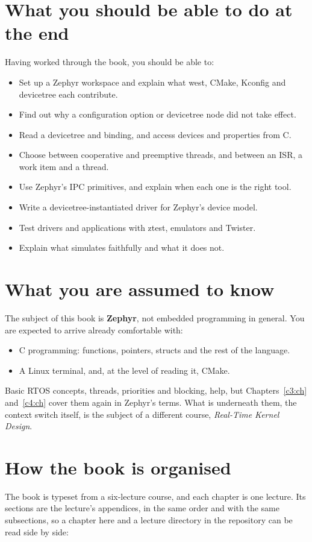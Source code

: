 \section*{What you should be able to do at the end}
Having worked through the book, you should be able to:
\begin{itemize}
  \item Set up a Zephyr workspace and explain what west, CMake, Kconfig and devicetree each
    contribute.
  \item Find out why a configuration option or devicetree node did not take effect.
  \item Read a devicetree and binding, and access devices and properties from C.
  \item Choose between cooperative and preemptive threads, and between an ISR, a work item and a
    thread.
  \item Use Zephyr's IPC primitives, and explain when each one is the right tool.
  \item Write a devicetree-instantiated driver for Zephyr's device model.
  \item Test drivers and applications with ztest, emulators and Twister.
  \item Explain what  simulates faithfully and what it does not.
\end{itemize}

\section*{What you are assumed to know}
The subject of this book is \textbf{Zephyr}, not embedded programming in general. You are expected
to arrive already comfortable with:
\begin{itemize}
  \item C programming: functions, pointers, structs and the rest of the language.
  \item A Linux terminal,  and, at the level of reading it, CMake.
\end{itemize}
Basic RTOS concepts, threads, priorities and blocking, help, but Chapters~\ref{c3:ch}
and~\ref{c4:ch} cover them again in Zephyr's terms. What is underneath them, the context switch
itself, is the subject of a different course, \emph{Real-Time Kernel Design}.

\section*{How the book is organised}
The book is typeset from a six-lecture course, and each chapter is one lecture. Its sections are
the lecture's appendices, in the same order and with the same subsections, so a chapter here and a
lecture directory in the repository can be read side by side:

